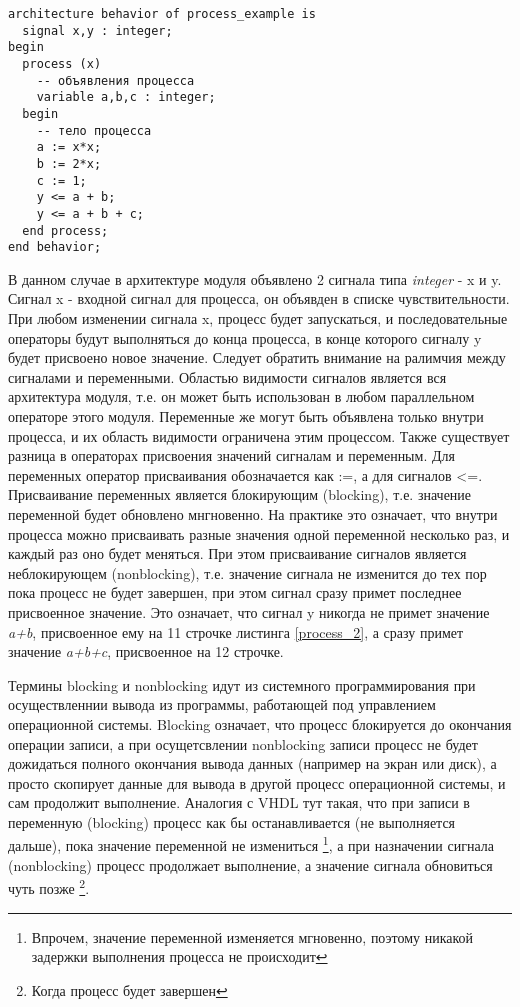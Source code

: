 \begin{Code}
\begin{lstlisting}[caption=Процесс с внутренними переменными и списком чувствительности, label=process_2]
architecture behavior of process_example is
  signal x,y : integer;
begin
  process (x)
    -- объявления процесса
    variable a,b,c : integer;
  begin
    -- тело процесса
    a := x*x;
    b := 2*x;
    c := 1;
    y <= a + b;
    y <= a + b + c;
  end process;
end behavior;
\end{lstlisting}
\end{Code}

В данном случае в архитектуре модуля объявлено 2 сигнала типа \emph{integer} - x и y. Сигнал x - входной сигнал для процесса, он объявден в списке чувствительности. При любом изменении сигнала x, процесс будет запускаться, и последовательные операторы будут выполняться до конца процесса, в конце которого сигналу y будет присвоено новое значение. Следует обратить внимание на ралимчия между сигналами и переменными. Областью видимости сигналов является вся архитектура модуля, т.е. он может быть использован в любом параллельном операторе этого модуля. Переменные же могут быть объявлена только внутри процесса, и их область видимости ограничена этим процессом. Также существует разница в операторах присвоения значений сигналам и переменным. Для переменных оператор присваивания обозначается как :=, а для сигналов <=. Присваивание переменных является блокирующим (blocking), т.е. значение переменной будет обновлено мнгновенно. На практике это означает, что внутри процесса можно присваивать разные значения одной переменной несколько раз, и каждый раз оно будет меняться. При этом присваивание сигналов является неблокирующем (nonblocking), т.е. значение сигнала не изменится до тех пор пока процесс не будет завершен, при этом сигнал сразу примет последнее присвоенное значение. Это означает, что сигнал y никогда не примет значение \emph{a+b}, присвоенное ему на 11 строчке листинга \ref{process_2}, а сразу примет значение \emph{a+b+c}, присвоенное на 12 строчке.

Термины blocking и nonblocking идут из системного программирования при осуществленнии вывода из программы, работающей под управлением операционной системы. Blocking означает, что процесс блокируется до окончания операции записи, а при осущетсвлении nonblocking записи процесс не будет дожидаться полного окончания вывода данных (например на экран или диск), а просто скопирует данные для вывода в другой процесс операционной системы, и сам продолжит выполнение. Аналогия с VHDL тут такая, что при записи в переменную (blocking) процесс как бы останавливается (не выполняется дальше), пока значение переменной не измениться \footnote{Впрочем, значение переменной изменяется мгновенно, поэтому никакой задержки выполнения процесса не происходит}, а при назначении сигнала (nonblocking) процесс продолжает выполнение, а значение сигнала обновиться чуть позже \footnote{Когда процесс будет завершен}.


